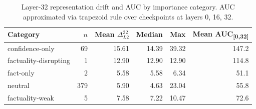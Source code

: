 \begin{table}[h]
\centering\small
\begin{tabular}{lrrrrr}
\toprule
Category & $n$ & Mean $\Delta_{L2}^{32}$ & Median & Max & Mean AUC\textsubscript{[0,32]} \\
\midrule
  confidence-only & 69 & 15.61 & 14.39 & 39.32 & 147.2 \\
  factuality-disrupting & 1 & 12.90 & 12.90 & 12.90 & 114.8 \\
  fact-only & 2 & 5.58 & 5.58 & 6.34 & 51.1 \\
  neutral & 379 & 5.90 & 4.63 & 23.04 & 55.8 \\
  factuality-weak & 5 & 7.58 & 7.22 & 10.47 & 72.6 \\
\bottomrule
\end{tabular}
\caption{Layer-32 representation drift and AUC by importance category. AUC approximated via trapezoid rule over checkpoints at layers 0, 16, 32.}
\label{tab:e4_layer_drift_stats}
\end{table}
